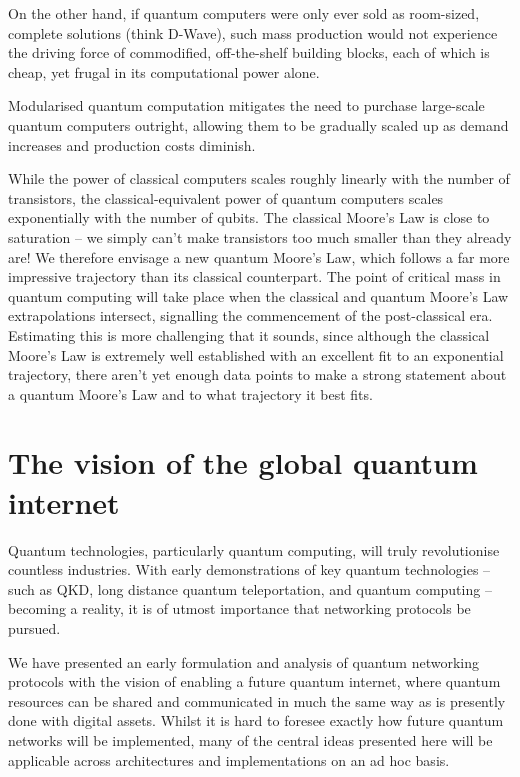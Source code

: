 \documentclass[aps,rmp,twocolumn,amsmath,amssymb,nofootinbib,superscriptaddress,longbibliography,floatfix]{revtex4-1}
\begin{document}
On the other hand, if quantum computers were only ever sold as room-sized, complete solutions (think D-Wave), such mass production would not experience the driving force of commodified, off-the-shelf building blocks, each of which is cheap, yet frugal in its computational power alone.

Modularised quantum computation mitigates the need to purchase large-scale quantum computers outright, allowing them to be gradually scaled up as demand increases and production costs diminish.

While the power of classical computers scales roughly linearly with the number of transistors, the classical-equivalent power of quantum computers scales exponentially with the number of qubits. The classical Moore's Law is close to saturation -- we simply can't make transistors too much smaller than they already are! We therefore envisage a new quantum Moore's Law, which follows a far more impressive trajectory than its classical counterpart. The point of critical mass in quantum computing will take place when the classical and quantum Moore's Law extrapolations intersect, signalling the commencement of the post-classical era. Estimating this is more challenging that it sounds, since although the classical Moore's Law is extremely well established with an excellent fit to an exponential trajectory, there aren't yet enough data points to make a strong statement about a quantum Moore's Law and to what trajectory it best fits.

%
%

\section{The vision of the global quantum internet}

Quantum technologies, particularly quantum computing, will truly revolutionise countless industries. With early demonstrations of key quantum technologies -- such as QKD, long distance quantum teleportation, and quantum computing -- becoming a reality, it is of utmost importance that networking protocols be pursued.

We have presented an early formulation and analysis of quantum networking protocols with the vision of enabling a future quantum internet, where quantum resources can be shared and communicated in much the same way as is presently done with digital assets. Whilst it is hard to foresee exactly how future quantum networks will be implemented, many of the central ideas presented here will be applicable across architectures and implementations on an ad hoc basis.
\end{document}
